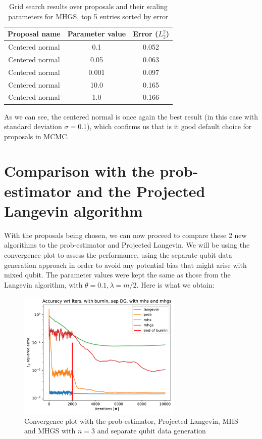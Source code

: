 \documentclass[12pt]{memoir}
\begin{document}
\begin{table}[H]

    \begin{center}
        \begin{tabular}{|c|c|c|}
            \hline
            Proposal name & Parameter value & Error ($L_2^2$)\\
            \hline\hline
            Centered normal& 0.1&0.052\\
            Centered normal& 0.05&0.063\\
            Centered normal& 0.001&0.097\\
            Centered normal& 10.0&0.165\\
            Centered normal& 1.0&0.166\\\hline
        \end{tabular}
\end{center}
\caption{Grid search results over proposals and their scaling parameters for MHGS, top 5 entries sorted by error}
\label{table:proposal-grid-search-mhgs}
\end{table}
As we can see, the centered normal is once again the best result (in this case with standard deviation $\sigma=0.1$), which confirms us that is it good default choice for proposals in MCMC.

\section{Comparison with the prob-estimator and the Projected Langevin algorithm}\label{section:mhs-mhgs-num-exp}
With the proposals being chosen, we can now proceed to compare these 2 new algorithms to the prob-estimator and Projected Langevin. We will be using the convergence plot to assess the performance, using the separate qubit data generation approach in order to avoid any potential bias that might arise with mixed qubit. The parameter values were kept the same as those from the Langevin algorithm, with $\theta=0.1,\lambda=m/2$. Here is what we obtain:\medbreak

\begin{figure}[H]
    \centering
    \includegraphics[width=0.7\textwidth]{figures/experiments/mhs_mhgs/iters_acc_comp_iters_no_avg_sep_prob_pl_mhs_mhgs-1.png}
    \caption{Convergence plot with the prob-estimator, Projected Langevin, MHS and MHGS with $n=3$ and separate qubit data generation}
    \label{fig:mhs-mhgs-conv-plot}
\end{figure}
\end{document}

